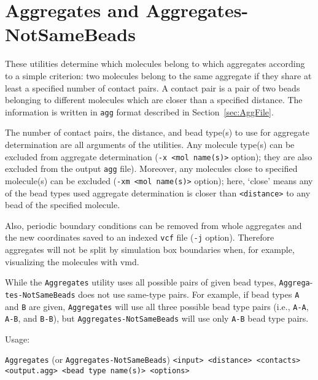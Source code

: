 \section{Aggregates and Aggregates-NotSameBeads} \label{sec:Aggregates}

These utilities determine which molecules belong to which aggregates
according to a simple criterion: two molecules belong to the same aggregate
if they share at least a specified number of contact pairs. A contact pair
is a pair of two beads belonging to different molecules which are closer
than a specified distance. The information is written in \texttt{agg}
format described in Section~\ref{sec:AggFile}.

The number of contact pairs, the distance, and bead type(s) to use for
aggregate determination are all arguments of the utilities.  Any molecule
type(s) can be excluded from aggregate determination (\texttt{-x <mol
name(s)>} option); they are also excluded from the output \texttt{agg}
file).  Moreover, any molecules close to specified molecule(s) can be
excluded (\texttt{-xm <mol name(s)>} option); here, `close' means any of
the bead types used aggregate determination is closer than
\texttt{<distance>} to any bead of the specified molecule.

Also, periodic boundary conditions can be removed from whole aggregates and
the new coordinates saved to an indexed \texttt{vcf} file (\texttt{-j}
option). Therefore aggregates will not be split by simulation box
boundaries when, for example, visualizing the molecules with vmd.

While the \texttt{Aggregates} utility uses all possible pairs of given bead
types, \texttt{Aggrega}-\texttt{tes-NotSameBeads} does not use same-type pairs. For
example, if bead types \texttt{A} and \texttt{B} are given,
\texttt{Aggregates} will use all three possible bead type pairs (i.e.,
\texttt{A-A}, \texttt{A-B}, and \texttt{B-B}), but
\texttt{Aggregates-NotSameBeads} will use only \texttt{A-B} bead type
pairs.

Usage:

\noindent
\vspace{1em}
\texttt{Aggregates} (or \texttt{Aggregates-NotSameBeads}) \texttt{<input>
<distance> <contacts> <output.agg> <bead type name(s)> <options>}

